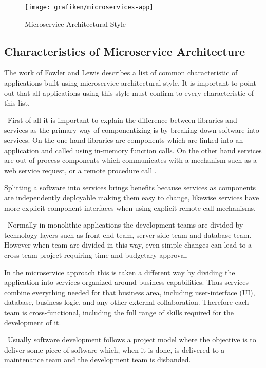 \begin{figure}[H]
	\centering
    \texttt{[image: grafiken/microservices-app]}
    \caption{Microservice Architectural Style}
    \label{fig:microservices}
\end{figure}

\subsection*{Characteristics of Microservice Architecture}
The work of Fowler and Lewis \cite{Fowler2014} describes a list of common characteristic of applications built using microservice architectural style. It is important to point out that all applications using this style must confirm to every characteristic of this list.

\begin{description}[style=nextline]
\item[Componentization via Services] \hfill \
First of all it is important to explain the difference between libraries and services as the primary way of componentizing is by breaking down software into services. On the one hand libraries are components which are linked into an application and called using in-memory function calls. On the other hand services are out-of-process components which communicates with a mechanism such as a web service request, or a remote procedure call \cite{Fowler2014}.

Splitting a software into services brings benefits because services as components are independently deployable making them easy to change, likewise services have more explicit component interfaces when using explicit remote call mechanisms. 
\item[Organized around Business Capabilities] \hfill \
Normally in monolithic applications the development teams are divided by technology layers such as front-end team, server-side team and database team. However when team are divided in this way, even simple changes can lead to a cross-team project requiring time and budgetary approval.

In the microservice approach this is taken a different way by dividing the application into services organized around business capabilities. Thus services combine everything needed for that business area, including user-interface (UI), database, business logic, and any other external collaboration. Therefore each team is cross-functional, including the full range of skills required for the development of it.
\item[Products not Projects] \hfill \
Usually software development follows a project model where the objective is to deliver some piece of software which, when it is done, is delivered to a maintenance team and the development team is disbanded.


\end{description}
